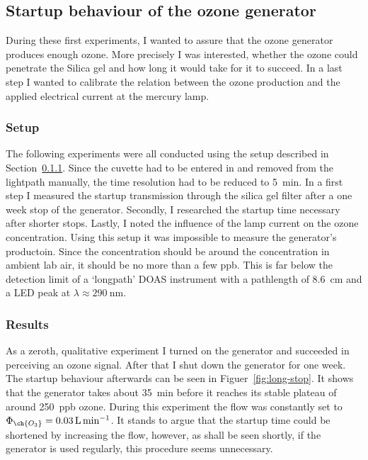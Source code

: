 \subsection{Startup behaviour of the ozone generator}
\label{sec:ozone}

During these first experiments, I wanted to assure that the ozone
generator produces enough ozone. More precisely I was interested,
whether the ozone could penetrate the Silica gel and how long it would
take for it to succeed. In a last step I wanted to calibrate the relation
between the ozone production and the applied electrical current at the
mercury lamp.

\subsubsection{Setup}
\label{sec:ozone-setup}

The following experiments were all conducted using the setup described
in Section~\ref{sec:ozone-setup}. Since the cuvette had to be entered
in and removed from the lightpath manually, the time resolution had to
be reduced to \SI{5}{\minute}. In a first step I measured the startup
 transmission through the silica gel filter after a one week
stop of the generator. Secondly, I researched the startup time
necessary after shorter stops. Lastly, I noted the influence of the
lamp current on the ozone concentration. Using this setup it was
impossible to measure the generator's  productoin. Since the
concentration should be around the  concentration in ambient
lab air, it should be no more than a few \si{ppb}. This is far below
the detection limit of a `longpath' DOAS instrument with a pathlength
of \SI{8.6}{\centi\meter} and a LED peak at $\lambda \approx
\SI{290}{\nano\meter}$.

\subsubsection{Results}
\label{sec:ozone-results}

As a zeroth, qualitative experiment I turned on the generator
and succeeded in perceiving an ozone signal. After that I shut down the generator
for one week. The startup behaviour afterwards can be seen in
Figuer~\ref{fig:long-stop}. It shows that the generator takes about
\SI{35}{\minute} before it reaches its stable plateau of around
\SI{250}{ppb} ozone. During this experiment the flow was constantly
set to $\Phi_{\ch{O_3}} = \SI{0.03}{\liter\per\minute}$. It stands to
argue that the startup time could be shortened by increasing the flow,
however, as shall be seen shortly, if the
generator is used regularly, this procedure seems unnecessary.

